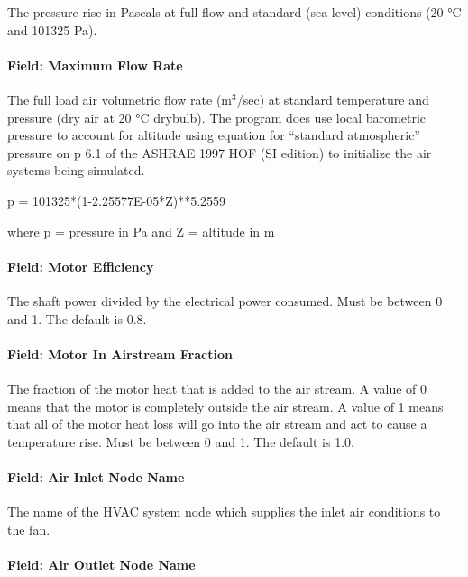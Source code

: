 The pressure rise in Pascals at full flow and standard (sea level) conditions (20 °C and 101325 Pa).

\paragraph{Field: Maximum Flow Rate}\label{field-maximum-flow-rate-1}

The full load air volumetric flow rate (m\(^{3}\)/sec) at standard temperature and pressure (dry air at 20 °C drybulb). The program does use local barometric pressure to account for altitude using equation for ``standard atmospheric'' pressure on p 6.1 of the ASHRAE 1997 HOF (SI edition) to initialize the air systems being simulated.

p = 101325*(1-2.25577E-05*Z)**5.2559

where p = pressure in Pa and Z = altitude in m

\paragraph{Field: Motor Efficiency}\label{field-motor-efficiency-1}

The shaft power divided by the electrical power consumed. Must be between 0 and 1. The default is 0.8.

\paragraph{Field: Motor In Airstream Fraction}\label{field-motor-in-airstream-fraction-1}

The fraction of the motor heat that is added to the air stream. A value of 0 means that the motor is completely outside the air stream. A value of 1 means that all of the motor heat loss will go into the air stream and act to cause a temperature rise. Must be between 0 and 1. The default is 1.0.

\paragraph{Field: Air Inlet Node Name}\label{field-air-inlet-node-name-1-002}

The name of the HVAC system node which supplies the inlet air conditions to the fan.

\paragraph{Field: Air Outlet Node Name}\label{field-air-outlet-node-name-1-001}

